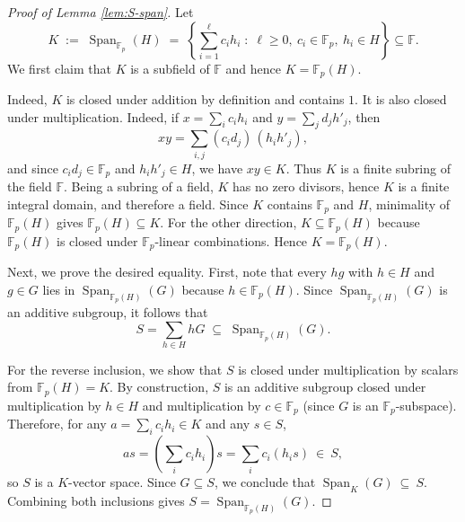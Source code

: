 \documentclass[11pt]{article}
\theoremstyle{plain}
\theoremstyle{definition}
\DeclareMathOperator{\Span}{Span}
\begin{document}
\begin{proof}[Proof of Lemma \ref{lem:S-span}]
Let
\[
K \;:=\; \Span_{\mathbb F_p}(H)
\;=\;
\left\{\sum_{i=1}^\ell c_i h_i \;:\; \ell\ge 0,\ c_i\in \mathbb F_p,\ h_i\in H\right\}\subseteq \mathbb F.
\]
We first claim that $K$ is a subfield of $\mathbb F$ and hence $K=\mathbb F_p(H)$.

Indeed, $K$ is closed under addition by definition and contains $1$.
It is also closed under multiplication. Indeed,  if $x=\sum_i c_i h_i$ and $y=\sum_j d_j h'_j$, then
\[
xy=\sum_{i,j} (c_i d_j)\,(h_i h'_j),
\]
and since $c_i d_j\in\mathbb F_p$ and $h_i h'_j\in H$,
we have $xy\in K$. Thus $K$ is a finite subring of the field $\mathbb F$.
Being a subring of a field, $K$ has no zero divisors, hence $K$ is a finite integral domain,
and therefore a field. Since $K$ contains $\mathbb F_p$ and $H$, minimality of $\mathbb F_p(H)$ gives
$\mathbb F_p(H)\subseteq K$. For the other direction,  $K\subseteq \mathbb F_p(H)$ because $\mathbb F_p(H)$
is closed under $\mathbb F_p$-linear combinations. Hence $K=\mathbb F_p(H)$.

Next, we prove the desired equality. First, note that every  $hg$ with $h\in H$ and $g\in G$
lies in $\Span_{\mathbb F_p(H)}(G)$ because $h\in \mathbb F_p(H)$. Since
$\Span_{\mathbb F_p(H)}(G)$ is an additive subgroup, it follows that
\[
S=\sum_{h\in H} hG \;\subseteq\; \Span_{\mathbb F_p(H)}(G).
\]

For the reverse inclusion, we show that $S$ is closed under multiplication by scalars from
$\mathbb F_p(H)=K$. By construction, $S$ is an additive subgroup closed under multiplication by  $h\in H$ and multiplication by  $c\in \mathbb F_p$ (since $G$ is an $\mathbb F_p$-subspace).
Therefore, for any $a=\sum_i c_i h_i\in K$ and any $s\in S$,
\[
a s = \left(\sum_i c_i h_i\right)s = \sum_i c_i (h_i s)\ \in\ S,
\]
so $S$ is a $K$-vector space. Since $G\subseteq S$, we conclude that
$
\Span_{K}(G)\ \subseteq\ S.
$
Combining both inclusions gives $S=\Span_{\mathbb F_p(H)}(G)$.
\end{proof}
\end{document}

